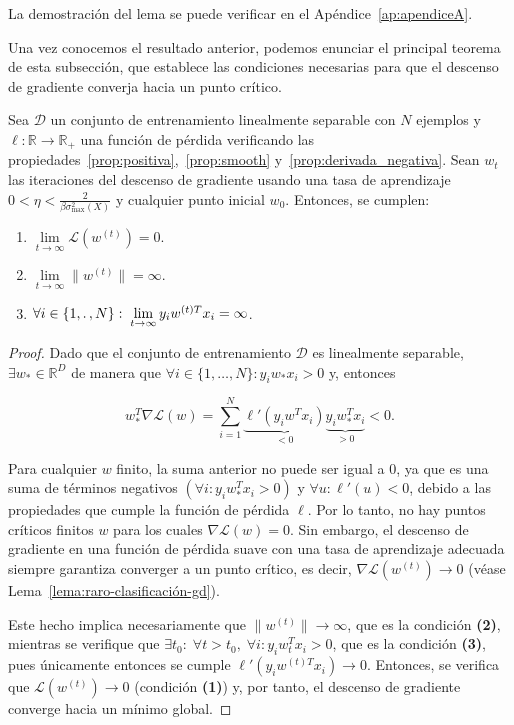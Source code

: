 La demostración del lema se puede verificar en el Apéndice~\ref{ap:apendiceA}.\newline

Una vez conocemos el resultado anterior, podemos enunciar el principal teorema de esta subsección, que establece las condiciones necesarias para que el descenso de gradiente converja hacia un punto crítico.

\begin{teorema}\label{teorema:clasificación-gd}
    Sea $\mathcal{D}$ un conjunto de entrenamiento linealmente separable con $N$ ejemplos y $\ell: \mathbb{R} \to \mathbb{R}_{+}$ una función de pérdida verificando las propiedades~\ref{prop:positiva},~\ref{prop:smooth} y~\ref{prop:derivada_negativa}. Sean $w_t$ las iteraciones del descenso de gradiente usando una tasa de aprendizaje $0 < \eta < \frac{2}{\beta \sigma^{2}_{\max}(X)}$ y cualquier punto inicial $w_0$. Entonces, se cumplen:

    \begin{enumerate}
        \item $\lim \limits_{t \to \infty} \mathcal{L}(w^{(t)}) = 0$.
        \item $\lim \limits_{t \to \infty} \| w^{(t)} \| = \infty$.
        \item $\forall i \in \{ 1, \ldotp, N\}: \; \lim \limits_{t \to \infty} y_i {w}^{(t)T} x_i = \infty$.
    \end{enumerate}
\end{teorema}

\begin{proof}
    Dado que el conjunto de entrenamiento $\mathcal{D}$ es linealmente separable, $\exists w_{*} \in \mathbb{R}^{D}$ de manera que $\forall i \in \{1, \ldots, N \} : y_i w_{*} x_i > 0$ y, entonces

    \[
        w_{*}^{T}\nabla\mathcal{L}(w) = \sum_{i=1}^{N} \underbrace{\ell'(y_i w^{T} x_i)}_{< 0} \underbrace{y_i w_{*}^{T}x_i}_{> 0} < 0.
    \]

    Para cualquier $w$ finito, la suma anterior no puede ser igual a $0$, ya que es una suma de términos negativos $(\forall i: y_i w_{*}^{T}x_i > 0)$ y $\forall u: \ell'(u) < 0$, debido a las propiedades que cumple la función de pérdida $\ell$. Por lo tanto, no hay puntos críticos finitos $w$ para los cuales $\nabla \mathcal{L}(w) = 0$. Sin embargo, el descenso de gradiente en una función de pérdida suave con una tasa de aprendizaje adecuada siempre garantiza converger a un punto crítico, es decir, $\nabla \mathcal{L}(w^{(t)}) \to 0$ (véase Lema~\ref{lema:raro-clasificación-gd}).\newline
    
    Este hecho implica necesariamente que $\| w^{(t)} \| \to \infty$, que es la condición \textbf{(2)}, mientras se verifique que $\exists t_0 : \; \forall t > t_0, \; \forall i: y_i w_{t}^{T} x_i > 0$, que es la condición \textbf{(3)}, pues únicamente entonces se cumple $\ell'(y_i {w}^{(t)T} x_i) \to 0$. Entonces, se verifica que $\mathcal{L}(w^{(t)}) \to 0$ (condición \textbf{(1)}) y, por tanto, el descenso de gradiente converge hacia un mínimo global.\newline
\end{proof}

